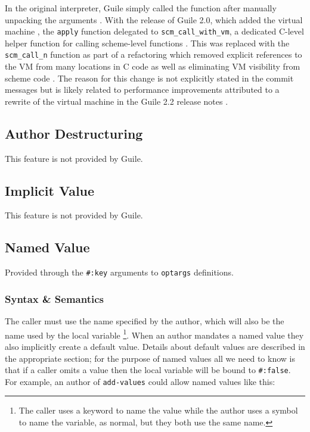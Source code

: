 In the original interpreter, Guile simply called the function after manually unpacking the
arguments
\parencite[][libguile/eval.c lines 1869-1985]{guile-first-commit}.
With the release of Guile 2.0, which added the virtual machine
\parencite[][NEWS lines 5068-5071]{guile-source},
the \texttt{apply} function delegated to \texttt{scm\_call\_with\_vm}, a dedicated C-level
helper function for calling scheme-level functions
\parencite[][libguile/eval.c lines 782-802]{guile-2.0}.
This was replaced with the \texttt{scm\_call\_n} function as part of a refactoring which
removed explicit references to the VM from many locations in C code as well as eliminating
VM visibility from scheme code
\parencite[][commit 165d9bf3a3bf34b53ed916743c6414f8030320c3 and earlier commits found
with \texttt{git log libguile/eval.c}]{guile-source}.
The reason for this change is not explicitly stated in the commit messages but is likely
related to performance improvements attributed to a rewrite of the virtual machine in the
Guile 2.2 release notes
\parencite[][NEWS lines 1995-2004, 2124-2205]{guile-source}.

\subsection{Author Destructuring}
This feature is not provided by Guile.

\subsection{Implicit Value}

This feature is not provided by Guile.

\subsection{Named Value}
Provided through the \texttt{\#:key} arguments to \texttt{optargs} definitions.

\subsubsection{Syntax \& Semantics}
The caller must use the name specified by the author, which will also be the name used by
the local variable
\footnote{
	The caller uses a keyword to name the value while the author uses a symbol to name the
	variable, as normal, but they both use the same name.
}.
When an author mandates a named value they also implicitly create a default value.
Details about default values are described in the appropriate section; for the purpose of
named values all we need to know is that if a caller omits a value then the local variable
will be bound to \texttt{\#:false}.
For example, an author of \texttt{add-values} could allow named values like this:

